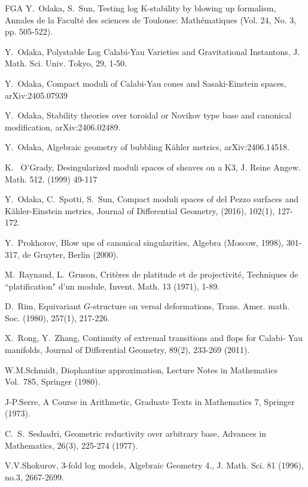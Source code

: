 \documentclass[12pt,a4paper]{amsart}
\theoremstyle{remark}
\theoremstyle{definition}
\begin{document}
\begin{thebibliography}{FGA}
Y.~Odaka, S.~Sun, 
Testing log K-stability by blowing up formalism, 
Annales de la Facult\'e des sciences de Toulouse: Math\'ematiques (Vol. 24, No. 3, pp. 505-522). 


Y.~Odaka, 
Polystable Log Calabi-Yau Varieties and Gravitational Instantons, 
J. Math. Sci. Univ. Tokyo, 29, 1-50. 

Y.~Odaka, 
Compact moduli of Calabi-Yau cones and Sasaki-Einstein spaces, 
arXiv:2405.07939 

Y.~Odaka, Stability theories over toroidal or Novikov type 
base and canonical modification, arXiv:2406.02489. 

Y.~Odaka, 
Algebraic geometry of bubbling K\"ahler metrics, 
arXiv:2406.14518. 

 K.~ O'Grady, Desingularized moduli spaces of sheaves on a K3, J. Reine Angew. Math. 
512. (1999) 49-117  

Y.~Odaka, C.~Spotti, S.~Sun, 
Compact moduli spaces of del Pezzo surfaces and K\"ahler-Einstein metrics, Journal of Differential Geometry, (2016), 102(1), 127-172.

Y.~Prokhorov, 
Blow ups of canonical singularities, 
Algebra (Moscow, 1998), 301-317, de Gruyter, Berlin (2000). 

M.~Raynaud, L.~Gruson, Crit\`eres de platitude et de 
projectivit\'e, Techniques de ``platification" d'un module, 
Invent. Math. 13 (1971), 1-89. 

D.~Rim,
Equivariant $G$-structure on versal deformations, Trans. Amer. math. Soc. (1980), 257(1), 217-226. 

X.~Rong, Y.~Zhang, 
Continuity of extremal transitions and flops for Calabi-
Yau manifolds, Journal of Differential Geometry, 89(2), 233-269 (2011). 

W.M.Schmidt, Diophantine approximation, 
Lecture Notes in Mathematics Vol.\ 785, Springer (1980). 

J-P.Serre, 
A Course in Arithmetic, 
Graduate Texts in Mathematics 7, Springer (1973). 

C.~S.~Seshadri, Geometric reductivity over arbitrary base, Advances in Mathematics, 26(3), 225-274 (1977). 

V.V.Shokurov, 
$3$-fold log models, 
Algebraic Geometry 4., J. Math. Sci. 81 
(1996), no.3, 2667-2699. 


\end{thebibliography}
\end{document}
